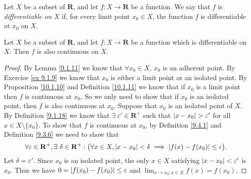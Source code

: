 \begin{definition}\label{10.1.11}
    Let \(X\) be a subset of \(\mathbf{R}\), and let \(f : X \to \mathbf{R}\) be a function.
    We say that \(f\) is \emph{differentiable on} \(X\) if, for every limit point \(x_0 \in X\), the function \(f\) is differentiable at \(x_0\) on \(X\).
\end{definition}

\begin{corollary}\label{10.1.12}
    Let \(X\) be a subset of \(\mathbf{R}\), and let \(f : X \to \mathbf{R}\) be a function which is differentiable on \(X\).
    Then \(f\) is also continuous on \(X\).
\end{corollary}

\begin{proof}
    By Lemma \ref{9.1.11} we know that \(\forall x_0 \in X\), \(x_0\) is an adherent point.
    By Exercise \ref{ex 9.1.9} we know that \(x_0\) is either a limit point or an isolated point.
    By Proposition \ref{10.1.10} and Definition \ref{10.1.11} we know that if \(x_0\) is a limit point then \(f\) is continuous at \(x_0\).
    So we only need to show that if \(x_0\) is an isolated point, then \(f\) is also continuous at \(x_0\).
    Suppose that \(x_0\) is an isolated point of \(X\).
    By Definition \ref{9.1.18} we know that \(\exists\ \varepsilon' \in \mathbf{R}^+\) such that \(\abs*{x - x_0} > \varepsilon'\) for all \(x \in X \setminus \{x_0\}\).
    To show that \(f\) is continuous at \(x_0\), by Definition \ref{9.4.1} and Definition \ref{9.3.6} we need to show that
    \[
        \forall \varepsilon \in \mathbf{R}^+, \exists\ \delta \in \mathbf{R}^+ : \big(\forall x \in X, \abs*{x - x_0} < \delta \implies \abs*{f(x) - f(x_0)} \leq \varepsilon\big).
    \]
    Let \(\delta = \varepsilon'\).
    Since \(x_0\) is an isolated point, the only \(x \in X\) satisfying \(\abs*{x - x_0} < \varepsilon'\) is \(x_0\).
    Thus we have \(0 = \abs*{f(x_0) - f(x_0)} \leq \varepsilon\) and \(\lim_{x \to x_0 ; x \in X} f(x) = f(x_0)\).
\end{proof}

